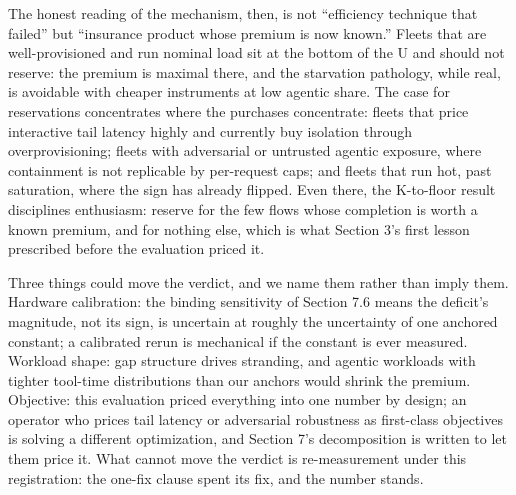 The honest reading of the mechanism, then, is not ``efficiency technique
that failed'' but ``insurance product whose premium is now known.'' Fleets
that are well-provisioned and run nominal load sit at the bottom of the
U and should not reserve: the premium is maximal there, and the
starvation pathology, while real, is avoidable with cheaper instruments
at low agentic share. The case for reservations concentrates where the
purchases concentrate: fleets that price interactive tail latency highly
and currently buy isolation through overprovisioning; fleets with
adversarial or untrusted agentic exposure, where containment is not
replicable by per-request caps; and fleets that run hot, past
saturation, where the sign has already flipped. Even there, the
K-to-floor result disciplines enthusiasm: reserve for the few flows
whose completion is worth a known premium, and for nothing else, which
is what Section 3's first lesson prescribed before the evaluation
priced it.

Three things could move the verdict, and we name them rather than imply
them. Hardware calibration: the binding sensitivity of Section 7.6
means the deficit's magnitude, not its sign, is uncertain at roughly
the uncertainty of one anchored constant; a calibrated rerun is
mechanical if the constant is ever measured. Workload shape: gap
structure drives stranding, and agentic workloads with tighter
tool-time distributions than our anchors would shrink the premium.
Objective: this evaluation priced everything into one number by design;
an operator who prices tail latency or adversarial robustness as
first-class objectives is solving a different optimization, and Section
7's decomposition is written to let them price it. What cannot move the
verdict is re-measurement under this registration: the one-fix clause
spent its fix, and the number stands.
